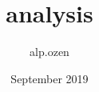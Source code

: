 \documentclass{article}
\title{analysis}
\author{alp.ozen}
\date{September 2019}
\begin{document}
\maketitle

\section{}
\end{document}
